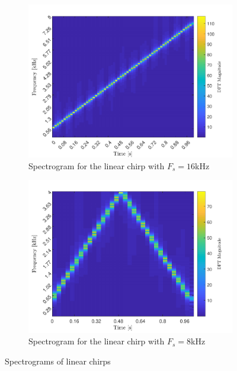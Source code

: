 \documentclass[10pt]{article}
\begin{document}
\begin{figure}[ht]
    \centering
    \begin{subfigure}[b]{0.48\textwidth}
        \includegraphics[width=\textwidth]{problem9_sonogram_linear_chirp.pdf}
        \caption{Spectrogram for the linear chirp with $F_s = 16$kHz}
    \end{subfigure}
    \quad
    \begin{subfigure}[b]{0.48\textwidth}
        \includegraphics[width=\textwidth]{problem9_sonogram_subsampled_linear_chirp.pdf}
        \caption{Spectrogram for the linear chirp with $F_s = 8$kHz}
    \end{subfigure}
    \caption{Spectrograms of linear chirps\vspace{-0.5cm}}
    \label{linear_chirp_spectrogram}
\end{figure}
\end{document}
